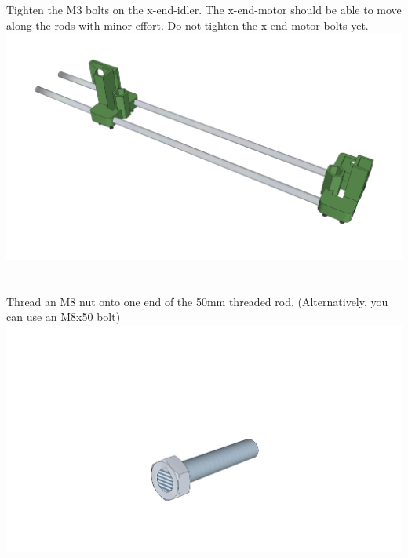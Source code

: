 \documentclass[twoside,a4paper,titlepage]{memoir}
\begin{document}
	\section{}
	Tighten the M3 bolts on the x-end-idler. The x-end-motor should be able to move along the rods with
	minor effort. Do not tighten the x-end-motor bolts yet.\\
	\includegraphics[width=1\linewidth]{graphics/ch7_8.png}
	
	\section{}
	Thread an M8 nut onto one end of the 50mm threaded rod. (Alternatively, you can use an M8x50 bolt)
	\includegraphics[width=1\linewidth]{graphics/ch7_9.png}
	
\end{document}
